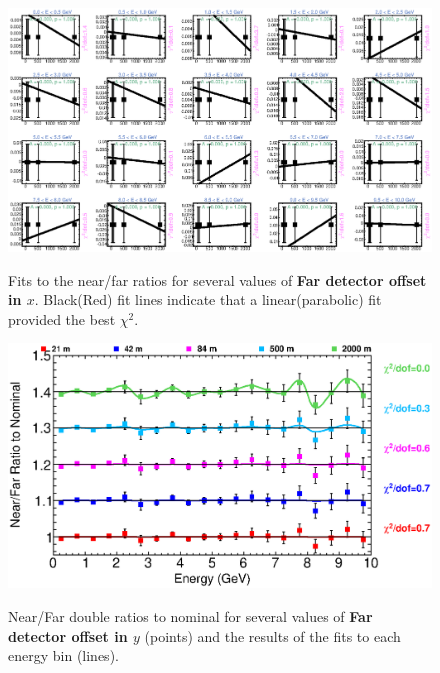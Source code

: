 \begin{figure}[ht]
  \begin{center}
    {\includegraphics[width=5.0in]{figures/LBNEFDX_nof_fits.eps}}
  \end{center}
\caption{ Fits to the near/far ratios for several values of {\bf Far detector offset in $x$}. Black(Red) fit lines indicate that a linear(parabolic) fit provided the best $\chi^2$. }
\end{figure}

\begin{figure}[ht]
  \begin{center}
    {\includegraphics[width=6.0in]{figures/LBNEFDY_nof_summary.eps}}
  \end{center}
\caption{ Near/Far double ratios to nominal for several values of {\bf Far detector offset in $y$} (points) and the results of the fits to each energy bin (lines).}
\end{figure}

